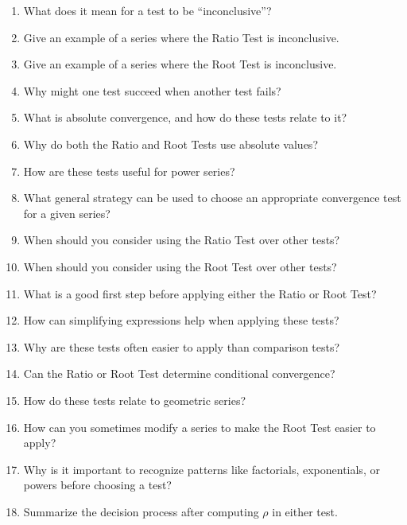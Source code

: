 \begin{enumerate}
  \item What does it mean for a test to be “inconclusive”?
  \item Give an example of a series where the Ratio Test is inconclusive.
  \item Give an example of a series where the Root Test is inconclusive.
  \item Why might one test succeed when another test fails?
  \item What is absolute convergence, and how do these tests relate to it?
  \item Why do both the Ratio and Root Tests use absolute values?
  \item How are these tests useful for power series?
  \item What general strategy can be used to choose an appropriate convergence test for a given series?
  \item When should you consider using the Ratio Test over other tests?
  \item When should you consider using the Root Test over other tests?
  \item What is a good first step before applying either the Ratio or Root Test?
  \item How can simplifying expressions help when applying these tests?
  \item Why are these tests often easier to apply than comparison tests?
  \item Can the Ratio or Root Test determine conditional convergence?
  \item How do these tests relate to geometric series?
  \item How can you sometimes modify a series to make the Root Test easier to apply?
  \item Why is it important to recognize patterns like factorials, exponentials, or powers before choosing a test?
  \item Summarize the decision process after computing $\rho$ in either test.
\end{enumerate}
